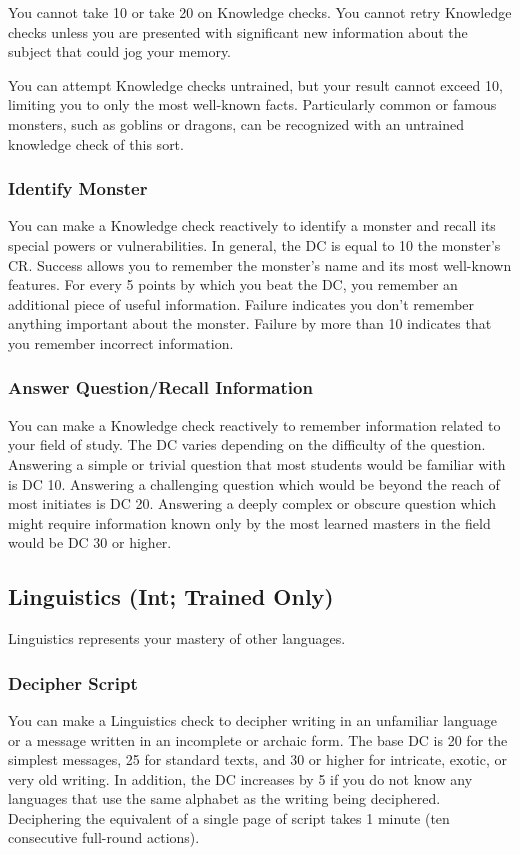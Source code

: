 You cannot take 10 or take 20 on Knowledge checks. You cannot retry Knowledge checks unless you are presented with significant new information about the subject that could jog your memory.

You can attempt Knowledge checks untrained, but your result cannot exceed 10, limiting you to only the most well-known facts. Particularly common or famous monsters, such as goblins or dragons, can be recognized with an untrained knowledge check of this sort. 

\subsubsection{Identify Monster}
You can make a Knowledge check reactively to identify a monster and recall its special powers or vulnerabilities. In general, the DC is equal to 10 \add the monster's CR. Success allows you to remember the monster's name and its most well-known features. For every 5 points by which you beat the DC, you remember an additional piece of useful information. Failure indicates you don't remember anything important about the monster. Failure by more than 10 indicates that you remember incorrect information.

\subsubsection{Answer Question/Recall Information}
You can make a Knowledge check reactively to remember information related to your field of study. The DC varies depending on the difficulty of the question. Answering a simple or trivial question that most students would be familiar with is DC 10. Answering a challenging question which would be beyond the reach of most initiates is DC 20. Answering a deeply complex or obscure question which might require information known only by the most learned masters in the field would be DC 30 or higher.

\subsection{Linguistics (Int; Trained Only)}
Linguistics represents your mastery of other languages.

\subsubsection{Decipher Script}
You can make a Linguistics check to decipher writing in an unfamiliar language or a message written in an incomplete or archaic form. The base DC is 20 for the simplest messages, 25 for standard texts, and 30 or higher for intricate, exotic, or very old writing. In addition, the DC increases by 5 if you do not know any languages that use the same alphabet as the writing being deciphered. Deciphering the equivalent of a single page of script takes 1 minute (ten consecutive full-round actions).

